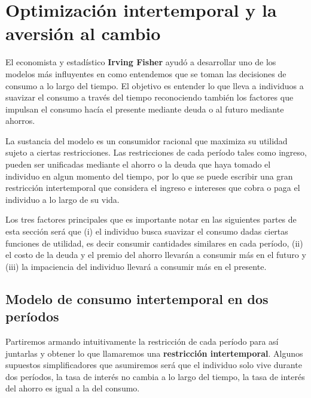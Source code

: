\section{Optimización intertemporal y la aversión al cambio}
El economista y estadístico \textbf{Irving Fisher} ayudó a desarrollar uno de los modelos más influyentes en como entendemos que se toman las decisiones de consumo a lo largo del tiempo. El objetivo es entender lo que lleva a individuos a suavizar el consumo a través del tiempo reconociendo también los factores que impulsan el consumo hacía el presente mediante deuda o al futuro mediante ahorros.

La sustancia del modelo es un consumidor racional que maximiza su utilidad sujeto a ciertas restricciones. Las restricciones de cada período tales como ingreso, pueden ser unificadas mediante el ahorro o la deuda que haya tomado el individuo en algun momento del tiempo, por lo que se puede escribir una gran restricción intertemporal que considera el ingreso e intereses que cobra o paga el individuo a lo largo de su vida. 

Los tres factores principales que es importante notar en las siguientes partes de esta sección será que (i) el individuo busca suavizar el consumo dadas ciertas funciones de utilidad, es decir consumir cantidades similares en cada período, (ii) el costo de la deuda y el premio del ahorro llevarán a consumir más en el futuro y (iii) la impaciencia del individuo llevará a consumir más en el presente.

\subsection{Modelo de consumo intertemporal en dos períodos}

Partiremos armando intuitivamente la restricción de cada período para así juntarlas y obtener lo que llamaremos una \textbf{restricción intertemporal}. Algunos supuestos simplificadores que asumiremos será que el individuo solo vive durante dos períodos, la tasa de interés no cambia a lo largo del tiempo, la tasa de interés del ahorro es igual a la del consumo.


